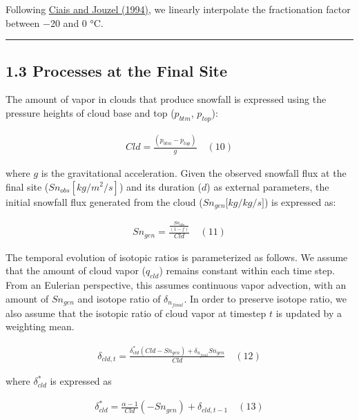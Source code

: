 \documentclass[11pt]{article}
\begin{document}
Following \hyperref[ciais1994]{Ciais and Jouzel (1994)}, we linearly interpolate the fractionation
factor between −20 and 0 °C.

\begin{center}\rule{0.5\linewidth}{0.5pt}\end{center}

\subsection{1.3 Processes at the Final Site}\label{processes-at-the-final-site}

The amount of vapor in clouds that produce snowfall is expressed using the pressure heights of cloud
base and top (\(p_{btm}\), \(p_{top}\)):

\[
\begin{array}{r}
Cld = \frac{\left( p_{btm} - p_{top} \right)}{g} \quad (10)
\end{array}
\]

where \(g\) is the gravitational acceleration. Given the observed snowfall flux at the final site
(\(Sn_{obs}\left\lbrack kg/m^{2}/s \right\rbrack\)) and its duration (\(d\)) as external parameters,
the initial snowfall flux generated from the cloud (\(Sn_{gen}\lbrack kg/kg/s\rbrack\)) is expressed
as:

\[
\begin{array}{r}
Sn_{gen} = \frac{\frac{Sn_{obs}}{(1 - f)}}{Cld} \quad (11)
\end{array}
\]

The temporal evolution of isotopic ratios is parameterized as follows. We assume that the amount of
cloud vapor (\(q_{cld}\)) remains constant within each time step. From an Eulerian perspective, this
assumes continuous vapor advection, with an amount of \(Sn_{gen}\) and isotope ratio of
\(\delta_{n_{final}}\). In order to preserve isotope ratio, we also assume that the isotopic ratio
of cloud vapor at timestep \(t\) is updated by a weighting mean.

\[
\begin{array}{r}
\delta_{cld,t} = \frac{\delta_{cld}^{*}\left( Cld - Sn_{gen} \right) + \delta_{n_{final}}Sn_{gen}}{Cld} \quad (12)
\end{array}
\]

where \(\delta_{cld}^{*}\) is expressed as

\[
\begin{array}{r}
\delta_{cld}^{*} = \frac{\alpha - 1}{Cld}\left( - Sn_{gen} \right) + \delta_{cld,t - 1} \quad (13)
\end{array}
\]
\end{document}
